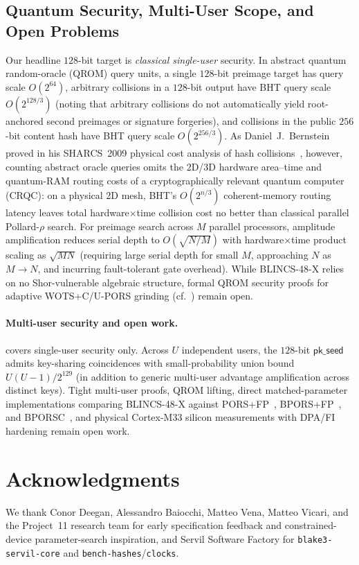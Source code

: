 \documentclass[11pt,a4paper]{article}
\theoremstyle{definition}
\theoremstyle{remark}
\newcommand{\BLINCS}{\textsf{BLINCS-48-X}}
\newcommand{\WOTSC}{\textsf{WOTS+C}}
\newcommand{\UPORS}{\textsf{U-PORS}}
\begin{document}
\subsection{Quantum Security, Multi-User Scope, and Open Problems}
\label{sec:quantum}
Our headline $128$-bit target is \emph{classical single-user} security. In abstract quantum random-oracle (QROM) query units, a single $128$-bit preimage target has query scale $O(2^{64})$, arbitrary collisions in a $128$-bit output have BHT query scale $O(2^{128/3})$ (noting that arbitrary collisions do not automatically yield root-anchored second preimages or signature forgeries), and collisions in the public $256$-bit content hash have BHT query scale $O(2^{256/3})$. As Daniel~J.~Bernstein proved in his SHARCS~2009 physical cost analysis of hash collisions~\cite{bernstein2009sharcs}, however, counting abstract oracle queries omits the 2D/3D hardware area--time and quantum-RAM routing costs of a cryptographically relevant quantum computer (CRQC): on a physical 2D mesh, BHT's $O(2^{n/3})$ coherent-memory routing latency leaves total hardware$\times$time collision cost no better than classical parallel Pollard-$\rho$ search. For preimage search across $M$ parallel processors, amplitude amplification reduces serial depth to $O(\sqrt{N/M})$ with hardware$\times$time product scaling as $\sqrt{MN}$ (requiring large serial depth for small $M$, approaching $N$ as $M \to N$, and incurring fault-tolerant gate overhead). While \BLINCS{} relies on no Shor-vulnerable algebraic structure, formal QROM security proofs for adaptive \WOTSC{}/\UPORS{} grinding (cf.~\cite{don2022qrom}) remain open.

\paragraph{Multi-user security and open work.}
 covers single-user security only. Across $U$ independent users, the $128$-bit $\mathsf{pk\_seed}$ admits key-sharing coincidences with small-probability union bound $U(U-1)/2^{129}$ (in addition to generic multi-user advantage amplification across distinct keys). Tight multi-user proofs, QROM lifting, direct matched-parameter implementations comparing \BLINCS{} against \textsf{PORS+FP}~\cite{abri2025porsfp}, \textsf{BPORS+FP}~\cite{ren2026bporsfp}, and \textsf{BPORSC}~\cite{wang2026bporsc}, and physical Cortex-M33 silicon measurements with DPA/FI hardening remain open work.

\section*{Acknowledgments}
We thank Conor Deegan, Alessandro Baiocchi, Matteo Vena, Matteo Vicari, and the Project~11 research team for early specification feedback and constrained-device parameter-search inspiration, and Servil Software Factory for \texttt{blake3-servil-core} and \texttt{bench-hashes}/\texttt{clocks}.



\end{document}
